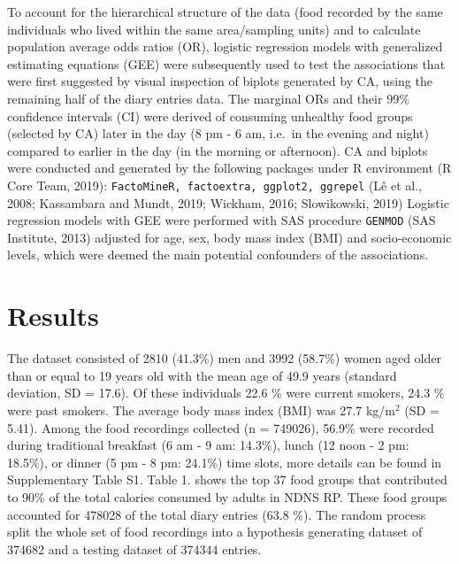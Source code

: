 \documentclass[utf8]{frontiersSCNS}
\begin{document}
To account for the hierarchical structure of the data (food recorded by
the same individuals who lived within the same area/sampling units) and
to calculate population average odds ratios (OR), logistic regression
models with generalized estimating equations (GEE) were subsequently
used to test the associations that were first suggested by visual
inspection of biplots generated by CA, using the remaining half of the
diary entries data. The marginal ORs and their 99\% confidence intervals
(CI) were derived of consuming unhealthy food groups (selected by CA)
later in the day (8 pm - 6 am, i.e.~in the evening and night) compared
to earlier in the day (in the morning or afternoon). CA and biplots were
conducted and generated by the following packages under R environment (R
Core Team, 2019): \texttt{FactoMineR, factoextra, ggplot2, ggrepel} (Lê
et al., 2008; Kassambara and Mundt, 2019; Wickham, 2016; Slowikowski,
2019) Logistic regression models with GEE were performed with SAS
procedure \texttt{GENMOD} (SAS Institute, 2013) adjusted for age, sex,
body mass index (BMI) and socio-economic levels, which were deemed the
main potential confounders of the associations.

\hypertarget{results}{%
\section*{Results}\label{results}}

The dataset consisted of 2810 (41.3\%) men and 3992 (58.7\%) women aged
older than or equal to 19 years old with the mean age of 49.9 years
(standard deviation, SD = 17.6). Of these individuals 22.6 \% were
current smokers, 24.3 \% were past smokers. The average body mass index
(BMI) was 27.7 kg/m\(^2\) (SD = 5.41). Among the food recordings
collected (n = 749026), 56.9\% were recorded during traditional
breakfast (6 am - 9 am: 14.3\%), lunch (12 noon - 2 pm: 18.5\%), or
dinner (5 pm - 8 pm: 24.1\%) time slots, more details can be found in
Supplementary Table S1. Table 1. shows the top 37 food groups that
contributed to 90\% of the total calories consumed by adults in NDNS RP.
These food groups accounted for 478028 of the total diary entries (63.8
\%). The random process split the whole set of food recordings into a
hypothesis generating dataset of 374682 and a testing dataset of 374344
entries.
\end{document}
